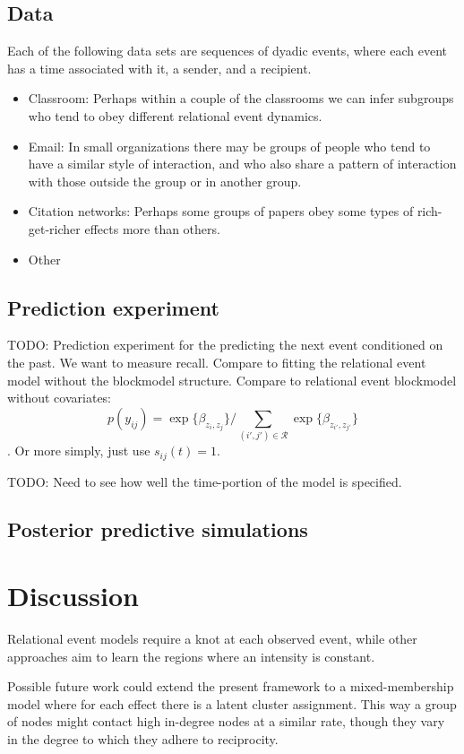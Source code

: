 \documentclass[11pt]{article}
\begin{document}
\subsection*{Data}

Each of the following data sets are sequences of dyadic events, where each event has a time associated with it, a sender, and a recipient.

\begin{itemize}
\item Classroom:  Perhaps within a couple of the classrooms we can infer subgroups who tend to obey different relational event dynamics.
\item Email: In small organizations there may be groups of people who tend to have a similar style of interaction, and who also share a pattern of interaction with those outside the group or in another group.
\item Citation networks: Perhaps some groups of papers obey some types of rich-get-richer effects more than others.
\item Other
\end{itemize}

\subsection*{Prediction experiment}
TODO: Prediction experiment for the predicting the next event conditioned on the past.  We want to measure recall.  Compare to fitting the relational event model without the blockmodel structure.  Compare to relational event blockmodel without covariates: $$p(y_{ij}) = \exp\{\beta_{z_i,z_j}\} / \sum_{(i',j') \in \mathcal{R}}\exp\{\beta_{z_{i'},z_{j'}}\} $$.
Or more simply, just use $s_{ij}(t) = 1$.

TODO: Need to see how well the time-portion of the model is specified.

\subsection*{Posterior predictive simulations}

\section{Discussion}
Relational event models \cite{Butts2008} require a knot at each observed event, while other approaches \cite{Meek2011} aim to learn the regions where an intensity is constant.

Possible future work could extend the present framework to a mixed-membership model where for each effect there is a latent cluster assignment.  This way a group of nodes might contact high in-degree nodes at a similar rate, though they vary in the degree to which they adhere to reciprocity.



\end{document}
